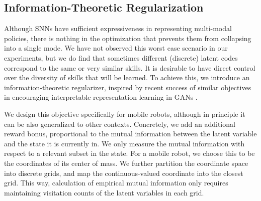 \documentclass{article} %
\begin{document}





\subsection{Information-Theoretic Regularization}
\label{section:method:inforeg}

Although SNNs have sufficient expressiveness in representing multi-modal policies, there is nothing in the optimization that prevents them from collapsing into a single mode. We have not observed this worst case scenario in our experiments, but we do find that sometimes different (discrete) latent codes correspond to the same or very similar skills. It is desirable to have direct control over the diversity of skills that will be learned. To achieve this, we introduce an information-theoretic regularizer, inspired by recent success of similar objectives in encouraging interpretable representation learning in GANs \citep{chen2016infogan}.

We design this objective specifically for mobile robots, although in principle it can be also generalized to other contexts.
Concretely, we add an additional reward bonus, proportional to the mutual information between the latent variable and the state it is currently in. We only measure the mutual information with respect to a relevant subset in the state. For a mobile robot, we choose this to be the coordinates of its center of mass. We further partition the coordinate space into discrete grids, and map the continuous-valued coordinate into the closest grid. This way, calculation of empirical mutual information only requires maintaining visitation counts of the latent variables in each grid.
\end{document}
